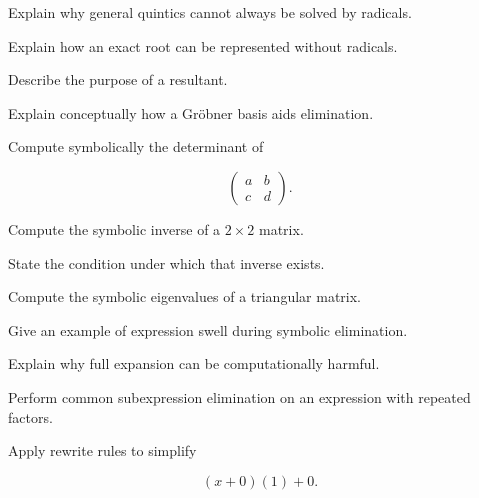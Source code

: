 \begin{exercise}[3]
Explain why general quintics cannot always be solved by radicals.
\end{exercise}

\begin{exercise}[3]
Explain how an exact root can be represented without radicals.
\end{exercise}

\begin{exercise}[3]
Describe the purpose of a resultant.
\end{exercise}

\begin{exercise}[3]
Explain conceptually how a Gröbner basis aids elimination.
\end{exercise}

\begin{exercise}[2]
Compute symbolically the determinant of

\[
\begin{pmatrix}
a&b\\
c&d
\end{pmatrix}.
\]
\end{exercise}

\begin{exercise}[3]
Compute the symbolic inverse of a \(2\times2\) matrix.
\end{exercise}

\begin{exercise}[3]
State the condition under which that inverse exists.
\end{exercise}

\begin{exercise}[3]
Compute the symbolic eigenvalues of a triangular matrix.
\end{exercise}

\begin{exercise}[3]
Give an example of expression swell during symbolic elimination.
\end{exercise}

\begin{exercise}[3]
Explain why full expansion can be computationally harmful.
\end{exercise}

\begin{exercise}[3]
Perform common subexpression elimination on an expression with repeated
factors.
\end{exercise}

\begin{exercise}[2]
Apply rewrite rules to simplify

\[
(x+0)(1)+0.
\]
\end{exercise}

